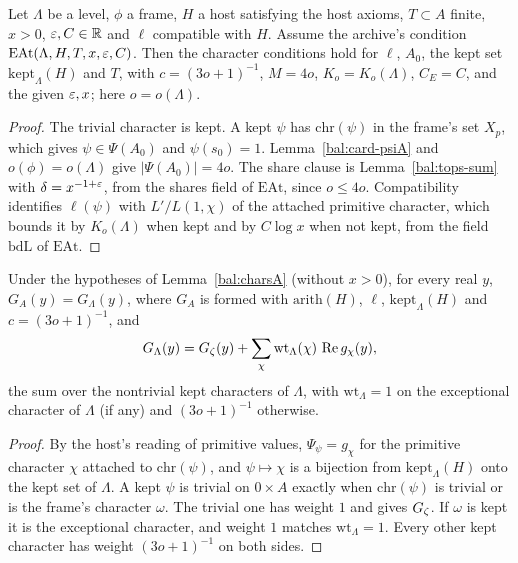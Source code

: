 \begin{lemma}\label{bal:charsA}
Let $\Lambda$ be a level, $\phi$ a frame, $H$ a host satisfying the host axioms, $T\subset A$ finite, $x>0$, $\varepsilon,C\in\mathbb{R}$ and $\ell$ compatible with $H$. Assume the archive's condition $\mathrm{EAt}(\Lambda,H,T,x,\varepsilon,C)$. Then the character conditions hold for $\ell$, $A_0$, the kept set $\mathrm{kept}_{\Lambda}(H)$ and $T$, with $c=(3o+1)^{-1}$, $M=4o$, $K_o=K_o(\Lambda)$, $C_E=C$, and the given $\varepsilon,x$; here $o=o(\Lambda)$.
\end{lemma}
\begin{proof}
The trivial character is kept. A kept $\psi$ has $\mathrm{chr}(\psi)$ in the frame's set $X_p$, which gives $\psi\in\Psi(A_0)$ and $\psi(s_0)=1$. Lemma~\ref{bal:card-psiA} and $o(\phi)=o(\Lambda)$ give $|\Psi(A_0)|=4o$. The share clause is Lemma~\ref{bal:tops-sum} with $\delta=x^{-1+\varepsilon}$, from the shares field of $\mathrm{EAt}$, since $o\le4o$. Compatibility identifies $\ell(\psi)$ with $L'/L(1,\chi)$ of the attached primitive character, which bounds it by $K_o(\Lambda)$ when kept and by $C\log x$ when not kept, from the field $\mathrm{bdL}$ of $\mathrm{EAt}$.
\end{proof}

\begin{lemma}\label{bal:gmA-eq}
Under the hypotheses of Lemma~\ref{bal:charsA} (without $x>0$), for every real $y$,
$G_A(y)=G_{\Lambda}(y)$, where $G_A$ is formed with $\mathrm{arith}(H)$, $\ell$, $\mathrm{kept}_{\Lambda}(H)$ and $c=(3o+1)^{-1}$, and
\[G_{\Lambda}(y)=G_{\zeta}(y)+\sum_{\chi}\mathrm{wt}_{\Lambda}(\chi)\,\operatorname{Re} g_{\chi}(y),\]
the sum over the nontrivial kept characters of $\Lambda$, with $\mathrm{wt}_{\Lambda}=1$ on the exceptional character of $\Lambda$ (if any) and $(3o+1)^{-1}$ otherwise.
\end{lemma}
\begin{proof}
By the host's reading of primitive values, $\Psi_{\psi}=g_{\chi}$ for the primitive character $\chi$ attached to $\mathrm{chr}(\psi)$, and $\psi\mapsto\chi$ is a bijection from $\mathrm{kept}_{\Lambda}(H)$ onto the kept set of $\Lambda$. A kept $\psi$ is trivial on $0\times A$ exactly when $\mathrm{chr}(\psi)$ is trivial or is the frame's character $\omega$. The trivial one has weight $1$ and gives $G_{\zeta}$. If $\omega$ is kept it is the exceptional character, and weight $1$ matches $\mathrm{wt}_{\Lambda}=1$. Every other kept character has weight $(3o+1)^{-1}$ on both sides.
\end{proof}

